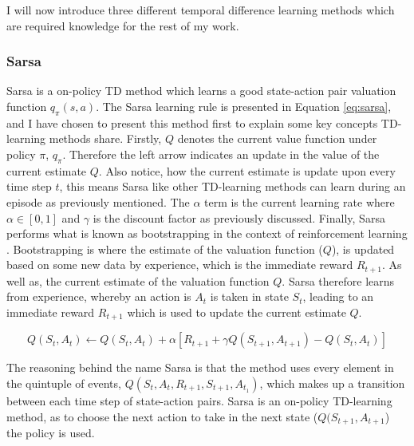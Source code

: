 \documentclass[../dissertation.tex]{subfiles}
\begin{document}
I will now introduce three different temporal difference learning methods which are required knowledge for the rest of my work.

\subsubsection*{Sarsa}

Sarsa is a on-policy TD method which learns a good state-action pair valuation function $q_\pi(s,a)$. The Sarsa learning rule is presented in Equation \ref{eq:sarsa}, and I have chosen to present this method first to explain some key concepts TD-learning methods share. Firstly, $Q$ denotes the current value function under policy $\pi$, $q_\pi$. Therefore the left arrow indicates an update in the value of the current estimate $Q$. Also notice, how the current estimate is update upon every time step $t$, this means Sarsa like other TD-learning methods can learn during an episode as previously mentioned. The $\alpha$ term is the current learning rate where $\alpha \in [0,1]$ and $\gamma$ is the discount factor as previously discussed. Finally, Sarsa performs what is known as bootstrapping in the context of reinforcement learning \cite{sutton2011reinforcement}. Bootstrapping is where the  estimate of the valuation function ($Q$), is updated based on some new data by experience, which is the immediate reward $R_{t+1}$. As well as, the current estimate of the valuation function $Q$. Sarsa therefore learns from experience, whereby an action is $A_t$ is taken in state $S_{t}$, leading to an immediate reward $R_{t+1}$ which is used to update the current estimate $Q$.

\begin{equation}
Q(S_t, A_t) \leftarrow Q(S_t, A_t) + \alpha[R_{t+1} + \gamma Q(S_{t+1}, A_{t+1}) - Q(S_t, A_t)]
\label{eq:sarsa}
\end{equation}

The reasoning behind the name Sarsa is that the method uses every element in the quintuple of events, $Q(S_t, A_t, R_{t+1}, S_{t+1}, A_{t_1})$, which makes up a transition between each time step of state-action pairs. Sarsa is an on-policy TD-learning method, as to choose the next action to take in the next state ($Q(S_{t+1}, A_{t+1}$) the policy is used. \\
\end{document}
